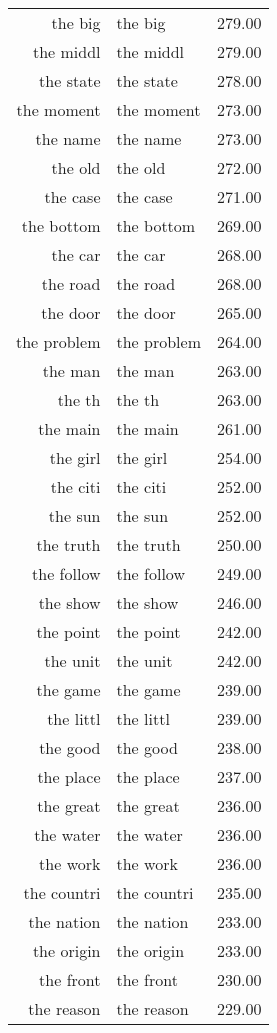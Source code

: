 \begin{table}[ht]
\begin{tabular}{rlr}
  the big & the big & 279.00 \\ 
  the middl & the middl & 279.00 \\ 
  the state & the state & 278.00 \\ 
  the moment & the moment & 273.00 \\ 
  the name & the name & 273.00 \\ 
  the old & the old & 272.00 \\ 
  the case & the case & 271.00 \\ 
  the bottom & the bottom & 269.00 \\ 
  the car & the car & 268.00 \\ 
  the road & the road & 268.00 \\ 
  the door & the door & 265.00 \\ 
  the problem & the problem & 264.00 \\ 
  the man & the man & 263.00 \\ 
  the th & the th & 263.00 \\ 
  the main & the main & 261.00 \\ 
  the girl & the girl & 254.00 \\ 
  the citi & the citi & 252.00 \\ 
  the sun & the sun & 252.00 \\ 
  the truth & the truth & 250.00 \\ 
  the follow & the follow & 249.00 \\ 
  the show & the show & 246.00 \\ 
  the point & the point & 242.00 \\ 
  the unit & the unit & 242.00 \\ 
  the game & the game & 239.00 \\ 
  the littl & the littl & 239.00 \\ 
  the good & the good & 238.00 \\ 
  the place & the place & 237.00 \\ 
  the great & the great & 236.00 \\ 
  the water & the water & 236.00 \\ 
  the work & the work & 236.00 \\ 
  the countri & the countri & 235.00 \\ 
  the nation & the nation & 233.00 \\ 
  the origin & the origin & 233.00 \\ 
  the front & the front & 230.00 \\ 
  the reason & the reason & 229.00 \\ 

\end{tabular}
\end{table}

